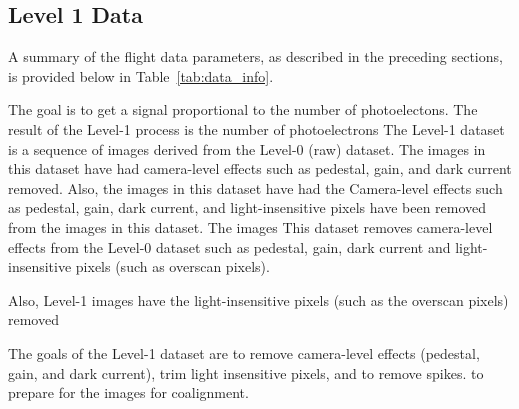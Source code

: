     \subsection{Level 1 Data}
    
  
    
    	
    	
    	A summary of the flight data parameters, as described in the preceding sections, is provided below in Table~\ref{tab:data_info}. 
    	
        The goal is to get a signal proportional to the number of photoelectons. 
        The result of the Level-1 process is the number of photoelectrons 
        The Level-1 dataset is a sequence of images derived from the Level-0 (raw) dataset.
        The images in this dataset have had camera-level effects such as pedestal, gain, and dark current removed.
        Also, the images in this dataset have had the 
        Camera-level effects such as pedestal, gain, dark current, and light-insensitive pixels have been removed from the images in this dataset.
        The images 
        This dataset removes camera-level effects from the Level-0 dataset such as pedestal, gain, dark current and light-insensitive pixels (such as overscan pixels).
        
        
        Also, Level-1 images have the light-insensitive pixels (such as the overscan pixels) removed 
    
        The goals of the Level-1 dataset are to remove camera-level effects (pedestal, gain, and dark current), trim light insensitive pixels, and to remove spikes. to prepare for the images for coalignment.
    
